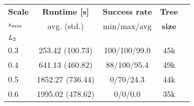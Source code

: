 \begin{tabular}{lcccc}
\toprule
{\bf Scale} & {\bf Runtime [s] } & {\bf Success rate} & {\bf Tree}\\ 
{$s_{min}$ }  & avg. (std.)       & min/max/avg & {\bf size } \\ 
\midrule
\multicolumn{2}{l}{$ L_2 $} \\ 
0.3 & 253.42 (100.73) & 100/100/99.0 & 45k  \\
0.4 & 641.13 (460.82) & 88/100/95.4 & 49k  \\
0.5 & 1852.27 (736.44) & 0/70/24.3 & 44k  \\
0.6 & 1995.02 (478.62) & 0/0/0.0 & 35k  \\
\bottomrule
\end{tabular}
